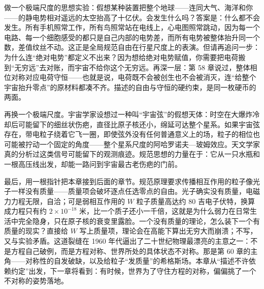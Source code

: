 \begin{thought}[把地球充电到十亿伏]
做一个极端尺度的思想实验：假想某种装置把整个地球——连同大气、海洋和你——的静电势相对遥远的太空抬高了十亿伏。会发生什么吗？答案是：什么都不会发生。所有手机照常工作，所有鸟照常站在电线上，心电图照常跳动，因为每一个电路、每一个细胞感受的都只是自己内部的电势差，而所有电势被整体抬升同一个数，差值纹丝不动。这正是全局规范自由在行星尺度上的表演。但请再追问一步：为什么连“绝对电势”都定义不出来？因为想给绝对电势赋值，你需要把电荷搬到“无穷远”去对账，而宇宙不给你这个无穷远。再深一层：第 58 章说过，整体相位对称对应电荷守恒——也就是说，电荷既不会被创生也不会被消灭，连“给整个宇宙抬升零点”的原材料都凑不齐。描述的自由与守恒的硬约束，是同一枚硬币的两面。

再换一个极端尺度。宇宙学家设想过一种叫“宇宙弦”的假想天体：时空在大爆炸冷却后可能留下的细丝状伤疤，直径比原子核还小，绵延可达整个星系。如果宇宙弦存在，带电粒子绕着它飞一圈，即使弦外没有任何普通意义上的场，粒子的相位也可能被拧动一个固定的角度——整个星系尺度的阿哈罗诺夫—玻姆效应。天文学家真的分析过这类信号可能留下的观测痕迹。规范思想的力量在于：它从一只水瓶和一根高压线出发，却能一路问到宇宙最古老伤疤的门前。
\end{thought}

\begin{mainline}
最后，用一根指针把本章接到后面的章节。规范原理要求传播相互作用的粒子像光子一样没有质量——质量项会破坏逐点任选零点的自由。光子确实没有质量，电磁力力程无限，自洽；可是弱相互作用的 \(W\) 粒子质量高达约 80 吉电子伏特，换算成力程只有约 \(2\times10^{-18}\) 米，比一个质子还小一千倍，这就是为什么弱力在日常生活中完全隐身，只在原子核的衰变里露脸。一个没有质量的理论，怎么装下一个有质量的现实？直接给 \(W\) 写上质量项，理论会在高能下算出无穷大而崩溃；不写，又与实验矛盾。这道裂缝在 1960 年代逼出了二十世纪物理最漂亮的主意之一：不是方程自己破例，而是方程对称、世界所处的具体状态不对称。那是第 60 章的主角——对称性的自发破缺，以及给粒子“发质量”的希格斯场。本章从“描述不许依赖约定”出发，下一章将看到：有时候，世界为了守住方程的对称，偏偏挑了一个不对称的姿势落地。
\end{mainline}

